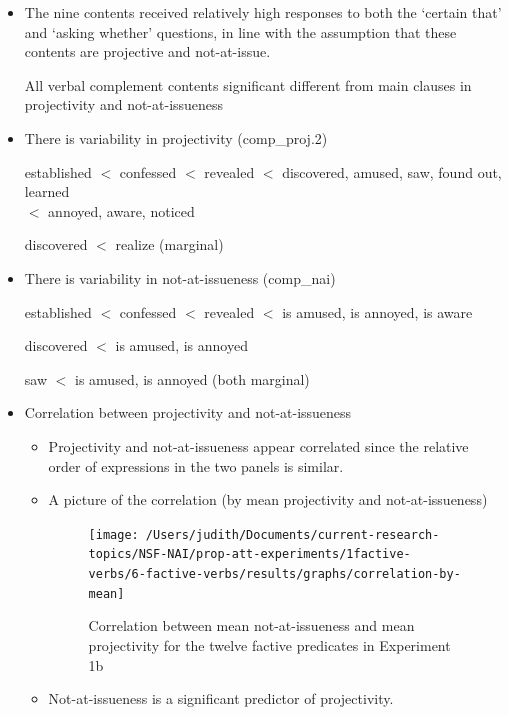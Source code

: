\documentclass[11pt,fleqn]{article}
\newcommand{\6}{\mbox{$[\hspace*{-.6mm}[$}}
\newcommand{\9}{\mbox{$]\hspace*{-.6mm}]$}}
\begin{document}
\begin{itemize}

\item The nine contents received relatively high responses to both the `certain that' and `asking whether' questions, in line with the assumption that these contents are projective and not-at-issue. 

All verbal complement contents significant different from main clauses in projectivity and not-at-issueness

\item There is variability in projectivity (comp\_proj.2)

established $<$ confessed $<$ revealed $<$ discovered, amused, saw, found out, learned \\ \hspace*{.2cm} \hfill $<$ annoyed, aware, noticed

discovered $<$ realize (marginal)

\item There is variability in not-at-issueness (comp\_nai)

established $<$ confessed $<$ revealed $<$ is amused, is annoyed, is aware

discovered $<$ is amused, is annoyed

saw $<$ is amused, is annoyed (both marginal)

\item Correlation between projectivity and not-at-issueness

\begin{itemize}

\item Projectivity and not-at-issueness appear correlated since the relative order of expressions in the two panels is similar. 

\item A picture of the correlation (by mean projectivity and not-at-issueness)

\begin{figure}[!h]

\begin{center}
\texttt{[image: /Users/judith/Documents/current-research-topics/NSF-NAI/prop-att-experiments/1factive-verbs/6-factive-verbs/results/graphs/correlation-by-mean]}

\end{center}

\caption{Correlation between mean not-at-issueness and mean projectivity for the twelve factive predicates in Experiment 1b}\label{f-corr2a}
\end{figure}

\item Not-at-issueness is a significant predictor of projectivity.


\end{itemize}

\end{itemize}
\end{document}
